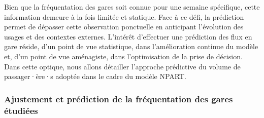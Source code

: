 \begin{refsegment}

Bien que la fréquentation des gares soit connue pour une semaine spécifique, cette information demeure à la fois limitée et statique. Face à ce défi, la prédiction permet de dépasser cette observation ponctuelle en anticipant l’évolution des usages et des contextes externes. L’intérêt d’effectuer une prédiction des flux en gare réside, d’un point de vue statistique, dans l'amélioration continue du modèle et, d’un point de vue aménagiste, dans l’optimisation de la prise de décision. Dans cette optique, nous allons détailler l'approche prédictive du volume de passager·ère·s adoptée dans le cadre du modèle \acrshort{NPART}.%

\subsubsection*{Ajustement et prédiction de la fréquentation des gares étudiées
    \label{chap6:methodologie-indicateurs-frequentation-prediction}
    }


\end{refsegment}

